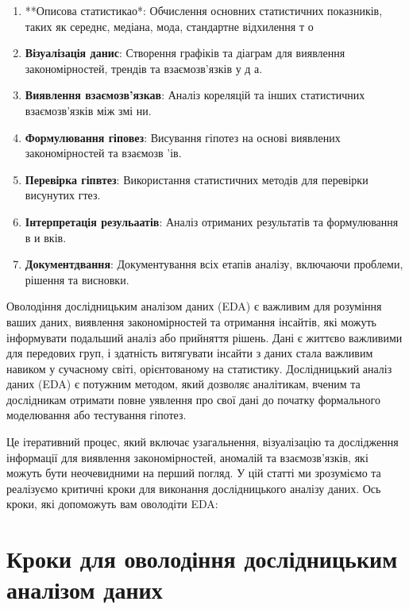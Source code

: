 \documentclass[
  letterpaper,
  DIV=11,
  numbers=noendperiod]{scrreprt}
\providecommand{\tightlist}{%
  \setlength{\itemsep}{0pt}\setlength{\parskip}{0pt}}\usepackage{longtable,booktabs,array}
\begin{document}
\begin{enumerate}
\def\labelenumi{\arabic{enumi}.}
\setcounter{enumi}{2}
\tightlist
\item
  **Описова статистикао*: Обчислення основних статистичних показників,
  таких як середнє, медіана, мода, стандартне відхилення т о
\item
  \textbf{Візуалізація данис}: Створення графіків та діаграм для
  виявлення закономірностей, трендів та взаємозв'язків у д а.
\item
  \textbf{Виявлення взаємозв'язкав}: Аналіз кореляцій та інших
  статистичних взаємозв'язків між змі ни.
\item
  \textbf{Формулювання гіповез}: Висування гіпотез на основі виявлених
  закономірностей та взаємозв 'ів.
\item
  \textbf{Перевірка гіпвтез}: Використання статистичних методів для
  перевірки висунутих гтез.
\item
  \textbf{Інтерпретація резульаатів}: Аналіз отриманих результатів та
  формулювання в и вків.
\item
  \textbf{Документдвання}: Документування всіх етапів аналізу, включаючи
  проблеми, рішення та висновки.
\end{enumerate}

Оволодіння дослідницьким аналізом даних (EDA) є важливим для розуміння
ваших даних, виявлення закономірностей та отримання інсайтів, які можуть
інформувати подальший аналіз або прийняття рішень. Дані є життєво
важливими для передових груп, і здатність витягувати інсайти з даних
стала важливим навиком у сучасному світі, орієнтованому на статистику.
Дослідницький аналіз даних (EDA) є потужним методом, який дозволяє
аналітикам, вченим та дослідникам отримати повне уявлення про свої дані
до початку формального моделювання або тестування гіпотез.

Це ітеративний процес, який включає узагальнення, візуалізацію та
дослідження інформації для виявлення закономірностей, аномалій та
взаємозв'язків, які можуть бути неочевидними на перший погляд. У цій
статті ми зрозуміємо та реалізуємо критичні кроки для виконання
дослідницького аналізу даних. Ось кроки, які допоможуть вам оволодіти
EDA:

\section{Кроки для оволодіння дослідницьким аналізом
даних}\label{ux43aux440ux43eux43aux438-ux434ux43bux44f-ux43eux432ux43eux43bux43eux434ux456ux43dux43dux44f-ux434ux43eux441ux43bux456ux434ux43dux438ux446ux44cux43aux438ux43c-ux430ux43dux430ux43bux456ux437ux43eux43c-ux434ux430ux43dux438ux445}
\end{document}
